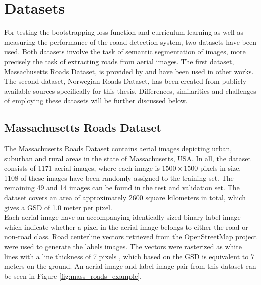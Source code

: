 \section{Datasets}
\label{sec:datasets}
For testing the bootstrapping loss function and curriculum learning as well as measuring the performance of the roaad detection system, two datasets have been used. Both datasets involve the task of semantic segmentation of images, more precisely the task of extracting roads from aerial images. The first dataset, Massachusetts Roads Dataset, is provided by \cite{MnihThesis} and have been used in other works. The second dataset, Norwegian Roads Dataset, has been created from publicly available sources specifically for this thesis. Differences, similarities and challenges of employing these datasets will be further discussed below.\\

\subsection{Massachusetts Roads Dataset}
The Massachusetts Roads Dataset contains aerial images depicting urban, suburban and rural areas in the state of Massachusetts, USA. In all, the dataset consists of 1171 aerial images, where each image is $1500\times 1500$ pixels in size. 1108 of these images have been randomly assigned to the training set. The remaining 49 and 14 images can be found in the test and validation set. The dataset covers an area of approximately 2600 square kilometers in total, which gives a \ac{GSD} of 1.0 meter per pixel.\\

Each aerial image have an accompanying identically sized binary label image which indicate whether a pixel in the aerial image belongs to either the road or non-road class. Road centerline vectors retrieved from the OpenStreetMap project were used to generate the labels images. The vectors were rasterized as white lines with a line thickness of 7 pixels \citep{MnihThesis}, which based on the \ac{GSD} is equivalent to 7 meters on the ground. An aerial image and label image pair from this dataset can be seen in Figure \ref{fig:mass_roads_example}.\\

